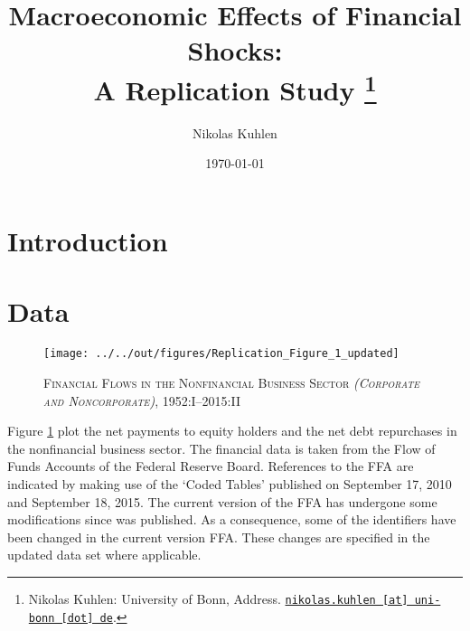 \documentclass[12pt,a4paper,leqno]{article}
\begin{document}
\title{Macroeconomic Effects of Financial Shocks: \\A Replication Study
\thanks{Nikolas Kuhlen: University of Bonn, Address. \href{mailto:nikolas.kuhlen@uni-bonn.de} {\nolinkurl{nikolas.kuhlen [at] uni-bonn [dot] de}}.}
}

\author{Nikolas Kuhlen
}

\date{\today}

\maketitle


\clearpage

\section{Introduction} %
\label{sec:introduction}

\section{Data} %
\label{sec:data}


\begin{figure}
    
    \centering

    \texttt{[image: ../../out/figures/Replication\_Figure\_1\_updated]}

    \caption{\textsc{Financial Flows in the Nonfinancial Business Sector \textit{(Corporate and Noncorporate)}}, 1952:I--2015:II}
    
    \label{fig:figure_1}

\end{figure}


Figure \ref{fig:figure_1} plot the net payments to equity holders and the net debt repurchases in the nonfinancial business sector. The financial data is taken from the Flow of Funds Accounts of the Federal Reserve Board. References to the FFA are indicated by making use of the ‘Coded Tables’ published on September 17, 2010 and September 18, 2015. The current version of the FFA has undergone some modifications since \citet{JERMANNfinancial} was published. As a consequence, some of the identifiers have been changed in the current  version FFA. These changes are specified in the updated data set where applicable.
\end{document}

